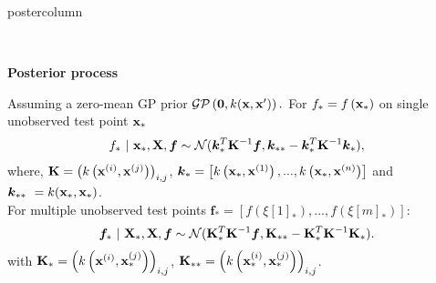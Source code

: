 \documentclass{beamer}
\begin{document}
\begin{frame}[fragile]{}
\begin{columns}
\begin{column}{.31\textwidth}
\begin{beamercolorbox}[center]{postercolumn}
\begin{minipage}{.98\textwidth}
{\begin{myblock}{}
								\begin{center}
										\\
								\end{center}
									


								\textbf{Posterior process} 
								
								Assuming a zero-mean GP prior $\mathcal{GP}\left(\bm{0}, k(\xv, \xv^\prime)\right).$ 
								For $ f_* = f\left(\xv_*\right)$ on single unobserved test point $\xv_*$ 
								\begin{eqnarray*}
									f_* ~|~ \xv_*, \Xmat, \bm{f} \sim \mathcal{N}(\bm{k}_{*}^{T}\Kmat^{-1}\bm{f}, \bm{k}_{**} - \bm{k}_*^T \Kmat ^{-1}\bm{k}_*),
								\end{eqnarray*}
								where, $\Kmat = \left(k\left(\xi, \xv^{(j)}\right)\right)_{i,j}$, $\bm{k}_* = \left[k\left(\xv_*, \xi[1]\right), ..., k\left(\xv_*, \xi[n]\right)\right]$ and $ \bm{k}_{**}\ = k(\xv_*, \xv_*)$. \\
								
								For multiple unobserved test points
								$
								\bm{f}_* = \left[f\left(\xi[1]_*\right), ..., f\left(\xi[m]_*\right)\right]:
								$
								\begin{eqnarray*}
									\bm{f}_* ~|~ \Xmat_*, \Xmat, \bm{f} \sim \mathcal{N}(\Kmat_{*}^{T}\Kmat^{-1}\bm{f}, \Kmat_{**} - \Kmat_*^T \Kmat ^{-1}\Kmat_*).
								\end{eqnarray*} 
								with $\Kmat_* = \left(k\left(\xi, \xv_*^{(j)}\right)\right)_{i,j}$, $\Kmat_{**} = \left(k\left(\xi[i]_*, \xi[j]_*\right)\right)_{i,j}$.\\
								

\end{myblock}}
\end{minipage}
\end{beamercolorbox}
\end{column}
\end{columns}
\end{frame}
\end{document}

